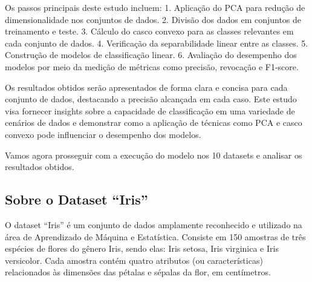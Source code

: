 \documentclass[11pt]{article}
\begin{document}
Os passos principais deste estudo incluem: 1. Aplicação do PCA para
redução de dimensionalidade nos conjuntos de dados. 2. Divisão dos dados
em conjuntos de treinamento e teste. 3. Cálculo do casco convexo para as
classes relevantes em cada conjunto de dados. 4. Verificação da
separabilidade linear entre as classes. 5. Construção de modelos de
classificação linear. 6. Avaliação do desempenho dos modelos por meio da
medição de métricas como precisão, revocação e F1-score.

Os resultados obtidos serão apresentados de forma clara e concisa para
cada conjunto de dados, destacando a precisão alcançada em cada caso.
Este estudo visa fornecer insights sobre a capacidade de classificação
em uma variedade de cenários de dados e demonstrar como a aplicação de
técnicas como PCA e casco convexo pode influenciar o desempenho dos
modelos.

Vamos agora prosseguir com a execução do modelo nos 10 datasets e
analisar os resultados obtidos.

    \hypertarget{sobre-o-dataset-iris}{%
\subsection{Sobre o Dataset ``Iris''}\label{sobre-o-dataset-iris}}

O dataset ``Iris'' é um conjunto de dados amplamente reconhecido e
utilizado na área de Aprendizado de Máquina e Estatística. Consiste em
150 amostras de três espécies de flores do gênero Iris, sendo elas: Iris
setosa, Iris virginica e Iris versicolor. Cada amostra contém quatro
atributos (ou características) relacionados às dimensões das pétalas e
sépalas da flor, em centímetros.
\end{document}
